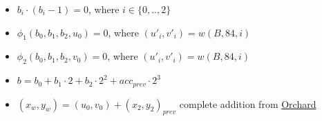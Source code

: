 \begin{itemize}
\begin{itemize}
        \item $b_i \cdot (b_i - 1) = 0$, where $i \in\{0,.., 2\}$
        \item $\phi_1(b_0, b_1, b_2, u_0) = 0$, where $(u'_{i}, v'_{i}) = w(B, 84, i)$
        \item $\phi_2(b_0, b_1, b_2, v_0) = 0$, where $(u'_{i}, v'_{i}) = w(B, 84, i)$
        \item $b = b_0 + b_1 \cdot 2 + b_2 \cdot 2^2 + acc_{prev} \cdot 2^3$
        \item $(x_w, y_w) = (u_0, v_0) + (x_2, y_2)_{prev}$  complete addition from \href{https://zcash.github.io/orchard/design/circuit/gadgets/ecc/addition.html} {Orchard}
    \end{itemize}
\end{itemize}